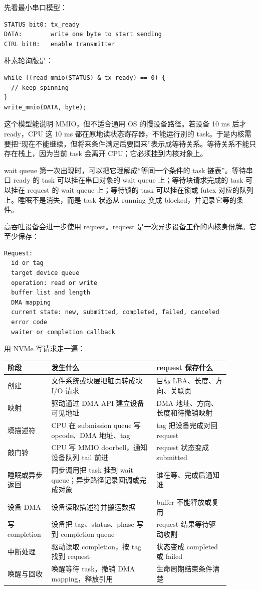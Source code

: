 先看最小串口模型：

\begin{lstlisting}
STATUS bit0: tx_ready
DATA:        write one byte to start sending
CTRL bit0:   enable transmitter
\end{lstlisting}

朴素轮询版是：

\begin{lstlisting}
while ((read_mmio(STATUS) & tx_ready) == 0) {
  // keep spinning
}
write_mmio(DATA, byte);
\end{lstlisting}

这个模型能说明 MMIO，但不适合通用 OS 的慢设备路径。若设备 10 ms 后才 ready，CPU 这 10 ms 都在原地读状态寄存器，不能运行别的 task。于是内核需要把“现在不能继续，但将来条件满足后要回来”表示成等待关系。等待关系不能只存在栈上，因为当前 task 会离开 CPU；它必须挂到内核对象上。

wait queue 第一次出现时，可以把它理解成“等同一个条件的 task 链表”。等待串口 ready 的 task 可以挂在串口对象的 wait queue 上；等待块请求完成的 task 可以挂在 request 的 wait queue 上；等待锁的 task 可以挂在锁或 futex 对应的队列上。睡眠不是消失，而是 task 状态从 running 变成 blocked，并记录它等的条件。

高吞吐设备会进一步使用 request。request 是一次异步设备工作的内核身份牌。它至少保存：

\begin{lstlisting}
Request:
  id or tag
  target device queue
  operation: read or write
  buffer list and length
  DMA mapping
  current state: new, submitted, completed, failed, canceled
  error code
  waiter or completion callback
\end{lstlisting}

用 NVMe 写请求走一遍：

\begin{longtable}{p{0.15\linewidth}p{0.43\linewidth}p{0.3\linewidth}}
\toprule
阶段 & 发生什么 & request 保存什么 \\
\midrule
创建 & 文件系统或块层把脏页转成块 I/O 请求 & 目标 LBA、长度、方向、关联页 \\
映射 & 驱动通过 DMA API 建立设备可见地址 & DMA 地址、方向、长度和待撤销映射 \\
填描述符 & CPU 在 submission queue 写 opcode、DMA 地址、tag & tag 把设备完成对回 request \\
敲门铃 & CPU 写 MMIO doorbell，通知设备队列 tail 前进 & request 状态变成 submitted \\
睡眠或异步返回 & 同步调用把 task 挂到 wait queue；异步路径记录回调或完成对象 & 谁在等、完成后通知谁 \\
设备 DMA & 设备读取描述符并搬运数据 & buffer 不能释放或复用 \\
写 completion & 设备把 tag、status、phase 写到 completion queue & request 结果等待驱动收割 \\
中断处理 & 驱动读取 completion，按 tag 找到 request & 状态变成 completed 或 failed \\
唤醒与回收 & 唤醒等待 task，撤销 DMA mapping，释放引用 & 生命周期结束条件清楚 \\
\bottomrule
\end{longtable}

